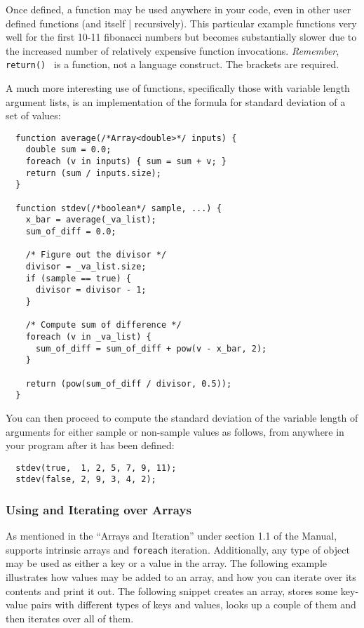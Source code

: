 Once defined, a function may be used anywhere in your code, even in other user 
defined functions (and itself | recursively). This particular example functions
very well for the first 10-11 fibonacci numbers but becomes substantially slower
due to the increased number of relatively expensive function invocations.
\emph{Remember}, {\tt return() } is a function, not a language construct.
The brackets are required.

A much more interesting use of functions, specifically those with variable
length argument lists, is an implementation of the formula for standard deviation
of a set of values:

\lstset{language=C++}
\begin{lstlisting}
  function average(/*Array<double>*/ inputs) {
    double sum = 0.0;
    foreach (v in inputs) { sum = sum + v; }
    return (sum / inputs.size);
  }
  
  function stdev(/*boolean*/ sample, ...) {
    x_bar = average(_va_list);
    sum_of_diff = 0.0;
    
    /* Figure out the divisor */
    divisor = _va_list.size;
    if (sample == true) {
      divisor = divisor - 1;
    }
    
    /* Compute sum of difference */
    foreach (v in _va_list) { 
      sum_of_diff = sum_of_diff + pow(v - x_bar, 2); 
    }
    
    return (pow(sum_of_diff / divisor, 0.5));
  }
\end{lstlisting}

You can then proceed to compute the standard deviation of the variable length of
arguments for either sample or non-sample values as follows, from anywhere in your
program after it has been defined:

\lstset{language=C++}
\begin{lstlisting}
  stdev(true,  1, 2, 5, 7, 9, 11);
  stdev(false, 2, 9, 3, 4, 2);
\end{lstlisting}

\subsubsection{Using and Iterating over Arrays}

As mentioned in the ``Arrays and Iteration'' under section 1.1 of the Manual, 
\ModLang supports intrinsic arrays and {\tt foreach} iteration. Additionally, any
type of object may be used as either a key or a value in the array. The following
example illustrates how values may be added to an array, and how you can 
iterate over its contents and print it out. The following snippet creates an array,
stores some key-value pairs with different types of keys and values, looks up a
couple of them and then iterates over all of them.

